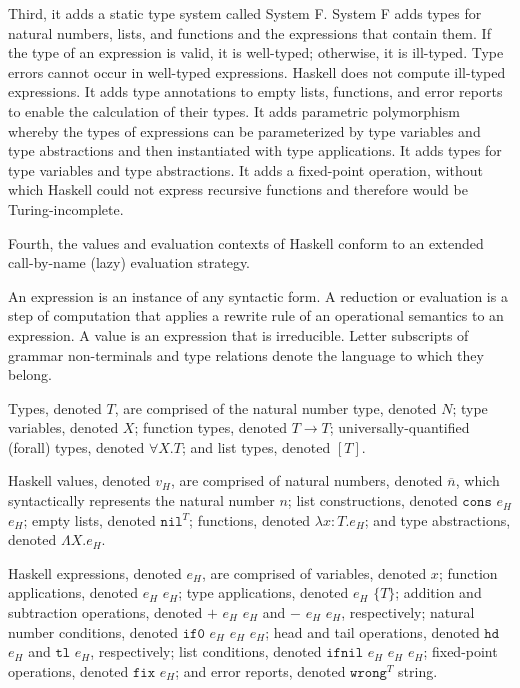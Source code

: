 Third, it adds a static type system called System F.  System F adds types for natural numbers, lists, and functions and the expressions that contain them.  If the type of an expression is valid, it is well-typed; otherwise, it is ill-typed.  Type errors cannot occur in well-typed expressions.  Haskell does not compute ill-typed expressions.  It adds type annotations to empty lists, functions, and error reports to enable the calculation of their types.  It adds parametric polymorphism whereby the types of expressions can be parameterized by type variables and type abstractions and then instantiated with type applications.  It adds types for type variables and type abstractions.  It adds a fixed-point operation, without which Haskell could not express recursive functions and therefore would be Turing-incomplete.

Fourth, the values and evaluation contexts of Haskell conform to an extended call-by-name (lazy) evaluation strategy.

An expression is an instance of any syntactic form.  A reduction or evaluation is a step of computation that applies a rewrite rule of an operational semantics to an expression.  A value is an expression that is irreducible.  Letter subscripts of grammar non-terminals and type relations denote the language to which they belong.

Types, denoted $T$, are comprised of the natural number type, denoted $N$; type variables, denoted $X$; function types, denoted $T\rightarrow T$; universally-quantified (forall) types, denoted $\forall X.T$; and list types, denoted $[T]$.

Haskell values, denoted $v_{H}$, are comprised of natural numbers, denoted $\overline{n}$, which syntactically represents the natural number $n$; list constructions, denoted $\mathtt{cons}$ $e_{H}$ $e_{H}$; empty lists, denoted $\mathtt{nil}^{T}$; functions, denoted $\lambda x:T.e_{H}$; and type abstractions, denoted $\Lambda X.e_{H}$.

Haskell expressions, denoted $e_{H}$, are comprised of variables, denoted $x$; function applications, denoted $e_{H}$ $e_{H}$; type applications, denoted $e_{H}$ $\lbrace T\rbrace$; addition and subtraction operations, denoted $+$ $e_{H}$ $e_{H}$ and $-$ $e_{H}$ $e_{H}$, respectively; natural number conditions, denoted $\mathtt{if0}$ $e_{H}$ $e_{H}$ $e_{H}$; head and tail operations, denoted $\mathtt{hd}$ $e_{H}$ and $\mathtt{tl}$ $e_{H}$, respectively; list conditions, denoted $\mathtt{ifnil}$ $e_{H}$ $e_{H}$ $e_{H}$; fixed-point operations, denoted $\mathtt{fix}$ $e_{H}$; and error reports, denoted $\mathtt{wrong}^{T}$ string.

